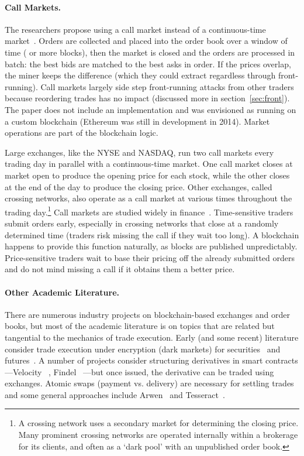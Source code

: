 \paragraph{Call Markets.} The researchers propose using a call market instead of a continuous-time market~\cite{clark2014decentralizing}. Orders are collected and placed into the order book over a window of time ( or more blocks), then the market is closed and the orders are processed in batch: the best bids are matched to the best asks in order. If the prices overlap, the miner keeps the difference (which they could extract regardless through front-running). Call markets largely side step front-running attacks from other traders because reordering trades has no impact (discussed more in section~\ref{sec:front}). The paper does not include an implementation and was envisioned as running on a custom blockchain (Ethereum was still in development in 2014). Market operations are part of the blockchain logic.

Large exchanges, like the NYSE and NASDAQ, run two call markets every trading day in parallel with a continuous-time market. One call market closes at market open to produce the opening price for each stock, while the other closes at the end of the day to produce the closing price. Other exchanges, called crossing networks, also operate as a call market at various times throughout the trading day.\footnote{A crossing network uses a secondary market for determining the closing price. Many prominent crossing networks are operated internally within a brokerage for its clients, and often as a `dark pool' with an unpublished order book.} Call markets are studied widely in finance~\cite{Har03}. Time-sensitive traders submit orders early, especially in crossing networks that close at a randomly determined time (traders risk missing the call if they wait too long). A blockchain happens to provide this function naturally, as blocks are published unpredictably. Price-sensitive traders wait to base their pricing off the already submitted orders and do not mind missing a call if it obtains them a better price. 

\paragraph{Other Academic Literature.} There are numerous industry projects on blockchain-based exchanges and order books, but most of the academic literature is on topics that are related but tangential to the mechanics of trade execution. Early (and some recent) literature consider trade execution under encryption (\ie dark markets) for securities~\cite{TP07,YSLT10,TW12,cartlidge2019mpc} and futures~\cite{massacci2018futuresmex}. A number of projects consider structuring derivatives in smart contracts---Velocity ~\cite{eskandari2017feasibility}, Findel ~\cite{biryukov2017findel}---but once issued, the derivative can be traded using exchanges. Atomic swaps (\ie payment vs. delivery) are necessary for settling trades and some general approaches include Arwen~\cite{heilman2020arwen} and Tesseract~\cite{bentov2017tesseract}.

